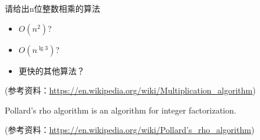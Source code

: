 \documentclass[a4paper, justified]{tufte-handout}
\begin{document}
\begin{solution}
\end{solution}


\beginot
\begin{ot}[乘法算法]
	请给出n位整数相乘的算法
	\begin{itemize}
		\item $O(n^2)$?
		\item $O(n^{\lg 3})$?
		\item 更快的其他算法？
	\end{itemize}
	(参考资料：\href{https://en.wikipedia.org/wiki/Multiplication_algorithm}{https://en.wikipedia.org/wiki/Multiplication\_algorithm})
\end{ot}


\begin{ot}
	Pollard's rho algorithm is an algorithm for integer factorization.

	(参考资料：\href{https://en.wikipedia.org/wiki/Pollard's_rho_algorithm}{https://en.wikipedia.org/wiki/Pollard's\_rho\_algorithm})
\end{ot}




% 




\beginfb

% 
% 
\end{document}
